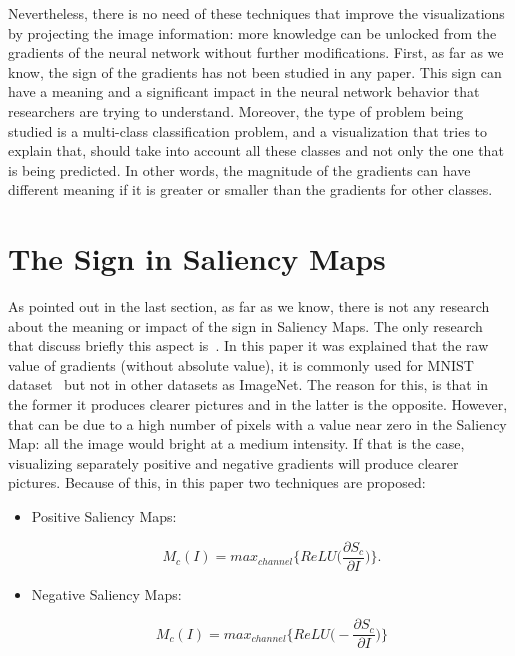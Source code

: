 \documentclass[preprint,12pt]{elsarticle}
\begin{document}
Nevertheless, there is no need of these techniques that improve the visualizations by projecting the image information: more knowledge can be unlocked from the gradients of the neural network without further modifications. First, as far as we know, the sign of the gradients has not been studied in any paper. This sign can have a meaning and a significant impact in the neural network behavior that researchers are trying to understand. Moreover, the type of problem being studied is a multi-class classification problem, and a visualization that tries to explain that, should take into account all these classes and not only the one that is being predicted. In other words, the magnitude of the gradients can have different meaning if it is greater or smaller than the gradients for other classes. 

\section{The Sign in Saliency Maps}
\label{sec:the sign in saliency maps}
As pointed out in the last section, as far as we know, there is not any research about the meaning or impact of the sign in Saliency Maps. The only research that discuss briefly this aspect is~\cite{smilkovSmoothGradRemovingNoise}. In this paper it was explained that the raw value of gradients (without absolute value), it is commonly used for MNIST dataset~\cite{MNISTHandwrittenDigit} but not in other datasets as ImageNet. The reason for this, is that in the former it produces clearer pictures and in the latter is the opposite. However, that can be due to a high number of pixels with a value near zero in the Saliency Map: all the image would bright at a medium intensity. If that is the case, visualizing separately positive and negative gradients will produce clearer pictures. Because of this, in this paper two techniques are proposed:

\begin{itemize}
    \item Positive Saliency Maps:
    
    \begin{equation}
        \label{eq: positive saliency map}
        M_c(I) = max_{channel}\bigg \{ ReLU \bigg (\frac{\partial S_c}{\partial I} \bigg ) \bigg \}.
    \end{equation}

    \item Negative Saliency Maps:
    
    \begin{equation}
        \label{eq: negative saliency map}
        M_c(I) = max_{channel}\bigg \{ ReLU \bigg (-\frac{\partial S_c}{\partial I} \bigg ) \bigg \}
    \end{equation}

\end{itemize}
\end{document}
